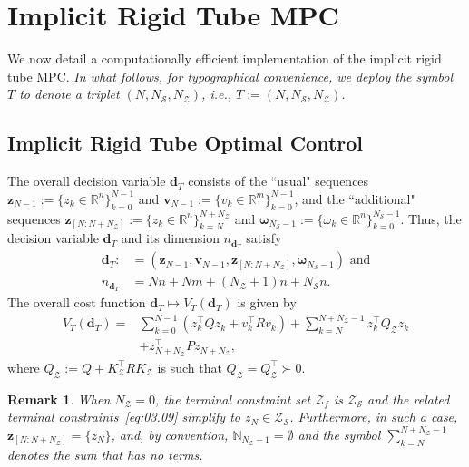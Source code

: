 \documentclass[twocolumn]{autart}
\newtheorem{remark}{Remark}
\newcommand{\mb}[1]{\mathbb{#1}}
\newcommand{\mc}[1]{\mathcal{#1}}
\newcommand{\mbf}[1]{\mathbf{#1}}
\newcommand{\N}{\mb{N}}
\newcommand{\R}{\mb{R}}
\numberwithin{equation}{section}
\begin{document}
\section{Implicit Rigid Tube MPC}
\label{sec:04}

We now detail  a computationally efficient implementation of the implicit rigid tube MPC.  \emph{In what follows, for typographical convenience, we deploy the symbol $T$ to denote a triplet $(N,N_\mc{S},N_\mc{Z})$, i.e., $T:=(N,N_\mc{S},N_\mc{Z})$.}

\subsection{Implicit Rigid Tube Optimal Control}
\label{sec:04.01}
The overall decision variable $\mbf{d}_T$ consists of the ``usual" sequences $\mbf{z}_{N-1}:=\{z_k\in\R^n\}_{k=0}^{N-1}$ and $\mbf{v}_{N-1}:=\{v_k\in\R^m\}_{k=0}^{N-1}$, and the ``additional" sequences $\mbf{z}_{[N:N+N_\mc{Z}]}:=\{z_k\in\R^n\}_{k=N}^{N+N_\mc{Z}}$ and $\boldsymbol{\omega}_{N_\mc{S}-1}:=\{\omega_k\in\R^n\}_{k=0}^{N_\mc{S}-1}$. Thus, the decision variable $\mbf{d}_T$ and its dimension $n_{\mbf{d}_T}$ satisfy 
\begin{align}
\mbf{d}_T:&=(\mbf{z}_{N-1},\mbf{v}_{N-1},\mbf{z}_{[N:N+N_\mc{Z}]},\boldsymbol{\omega}_{N_\mc{S}-1})\text{ and}\nonumber\\
\label{eq:04.01}
n_{\mbf{d}_T}&=Nn+Nm+(N_\mc{Z}+1)n+N_\mc{S}n.
\end{align}
The overall cost function $\mbf{d}_T\mapsto V_T(\mbf{d}_T)$ is given by
\begin{align}
V_T(\mbf{d}_T)=&\sum_{k=0}^{N-1} (z_k^\top Q z_k+v_k^\top R v_k)+\sum_{k=N}^{N+N_{\mc{Z}}-1} z_k^\top Q_\mc{Z} z_k\nonumber\\
\label{eq:04.02}
&+ z_{N+N_{\mc{Z}}}^\top P z_{N+N_{\mc{Z}}},
\end{align}
where $Q_\mc{Z}:=Q+K_\mc{Z}^\top R K_\mc{Z}$ is such that $Q_\mc{Z}=Q_\mc{Z}^\top \succ 0$.
\begin{remark}
\label{rem:04.01}
When $N_\mc{Z}=0$, the terminal constraint set $\mc{Z}_f$ is $\mc{Z}_\mc{S}$ and the related terminal constraints~\eqref{eq:03.09} simplify to $z_N\in\mc{Z}_\mc{S}$.  Furthermore, in such a case, $\mbf{z}_{[N:N+N_\mc{Z}]}=\{z_N\}$, and, by convention, $\N_{N_{\mc{Z}}-1}=\emptyset$ and the symbol $\sum_{k=N}^{N+N_{\mc{Z}}-1}$ denotes the sum that has no terms. 
\end{remark}
\end{document}
